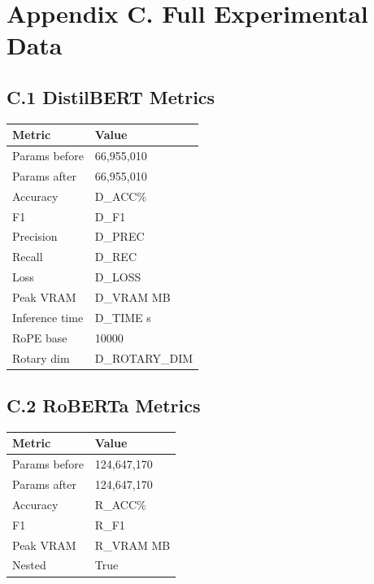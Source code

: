 
\section{Appendix C. Full Experimental Data}

\subsection{C.1 DistilBERT Metrics}

\begin{table}[H]
\centering
\small
\begin{tabular}{ll}
\toprule
\textbf{Metric} & \textbf{Value} \\
\midrule
Params before & 66,955,010 \\
Params after & 66,955,010 \\
Accuracy & {{D\_ACC}}\% \\
F1 & {{D\_F1}} \\
Precision & {{D\_PREC}} \\
Recall & {{D\_REC}} \\
Loss & {{D\_LOSS}} \\
Peak VRAM & {{D\_VRAM}} MB \\
Inference time & {{D\_TIME}} s \\
RoPE base & 10000 \\
Rotary dim & {{D\_ROTARY\_DIM}} \\
\bottomrule
\end{tabular}
\end{table}

\subsection{C.2 RoBERTa Metrics}

\begin{table}[H]
\centering
\small
\begin{tabular}{ll}
\toprule
\textbf{Metric} & \textbf{Value} \\
\midrule
Params before & 124,647,170 \\
Params after & 124,647,170 \\
Accuracy & {{R\_ACC}}\% \\
F1 & {{R\_F1}} \\
Peak VRAM & {{R\_VRAM}} MB \\
Nested & True \\
\bottomrule
\end{tabular}
\end{table}

